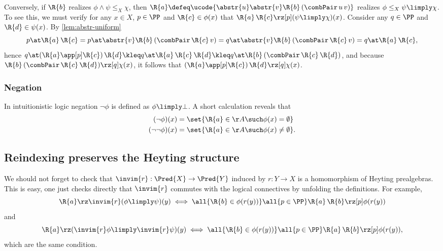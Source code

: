 Conversely, if $\R{b}$ realizes $\phi \land \psi \leq_X \chi$, then $\R{a} \defeq \ucode{\abstr{u} \abstr{v} \R{b} \, (\combPair \, u \, v)}$ realizes $\phi \leq_X \psi \limply \chi$.
To see this, we must verify for any $x \in X$, $p \in \PP$ and $\R{c} \in \phi(x)$ that $\R{a} \, \R{c} \rz[p] (\psi \limply \chi)(x)$.
%
Consider any $q \in \PP$ and $\R{d} \in \psi(x)$.
%
By \cref{lem:abstr-uniform}
%
\begin{equation*}
  p \at \R{a} \, \R{c} =
  p \at \abstr{v} \R{b} \, (\combPair \, \R{c} \, v) =
  q \at \abstr{v} \R{b} \, (\combPair \, \R{c} \, v) =
  q \at \R{a} \, \R{c},
\end{equation*}
%
hence
%
$
  q \at (\R{a} \app[p] \R{c}) \, \R{d} \kleq
  q \at \R{a} \, \R{c} \, \R{d} \kleq
  q \at \R{b} \, (\combPair \, \R{c} \, \R{d})
$,
%
and because $\R{b} \, (\combPair \, \R{c} \, \R{d}) \rz[q] \chi(x)$, it follows that $(\R{a} \app[p] \R{c}) \, \R{d} \rz[q] \chi(x)$.

\subsubsection{Negation}
\label{sec:negation}

In intuitionistic logic negation $\neg \phi$ is defined as $\phi \limply \bot$. A short calculation reveals that
%
\begin{align*}
  (\neg \phi)(x) &= \set{\R{a} \in \AA \such \phi(x) = \emptyset} \\
  (\neg\neg \phi)(x) &= \set{\R{a} \in \AA \such \phi(x) \neq \emptyset}.
\end{align*}
%

\subsection{Reindexing preserves the Heyting structure}
\label{sec:monot-reind}

We should not forget to check that $\invim{r} : \Pred{X} \to \Pred{Y}$ induced by $r : Y \to X$ is a homomorphism of Heyting prealgebras. This is easy, one just checks directly that $\invim{r}$ commutes with the logical connectives by unfolding the definitions. For example,
%
\begin{equation*}
  \R{a} \rz \invim{r}(\phi \limply \psi)(y)
  \iff
  \all{\R{b} \in \phi(r(y))}
  \all{p \in \PP}
  \R{a} \, \R{b} \rz[p] \phi(r(y))
\end{equation*}
%
and
%
\begin{equation*}
  \R{a} \rz (\invim{r}\phi \limply \invim{r}\psi)(y)
  \iff
  \all{\R{b} \in \phi(r(y))}
  \all{p \in \PP}
  \R{a} \, \R{b} \rz[p] \phi(r(y)),
\end{equation*}
%
which are the same condition.

